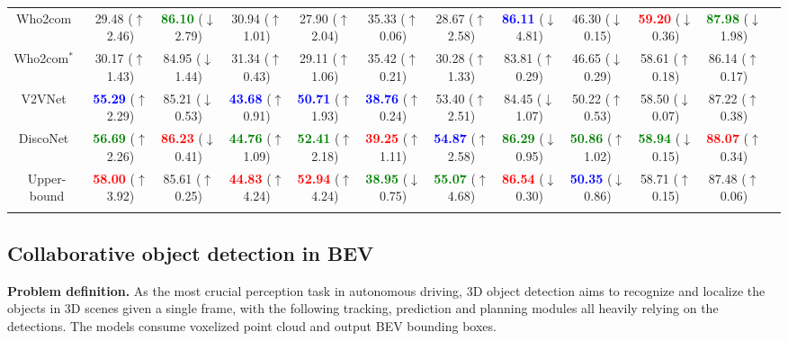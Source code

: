 \begin{table*}[t]
{\begin{tabular}{@{}cccccccccccc@{}}
Who2com~\cite{Liu2020Who2comCP} & 29.48 ($\uparrow$2.46) & \textbf{\textcolor{green}{86.10}} ($\downarrow$2.79) & 30.94 ($\uparrow$1.01) & 27.90 ($\uparrow$2.04) & 35.33 ($\uparrow$0.06) & 28.67 ($\uparrow$2.58) & \textbf{\textcolor{blue}{86.11}} ($\downarrow$4.81) & 46.30 ($\downarrow$0.15) & \textbf{\textcolor{red}{59.20}} ($\downarrow$0.36) & \textbf{\textcolor{green}{87.98}} ($\downarrow$1.98)  \\
Who2com$^*$~\cite{Liu2020Who2comCP} & 30.17 ($\uparrow$1.43) & 84.95 ($\downarrow$1.44) & 31.34 ($\uparrow$0.43) & 29.11 ($\uparrow$1.06) & 35.42 ($\uparrow$0.21) & 30.28 ($\uparrow$1.33) & 83.81 ($\uparrow$0.29) & 46.65 ($\downarrow$0.29) & 58.61 ($\uparrow$0.18) & 86.14 ($\uparrow$0.17) \\
V2VNet~\cite{Wang2020V2VNetVC} & \textbf{\textcolor{blue}{55.29}} ($\uparrow$2.29) & 85.21 ($\downarrow$0.53) & \textbf{\textcolor{blue}{43.68}} ($\uparrow$0.91) & \textbf{\textcolor{blue}{50.71}} ($\uparrow$1.93) & \textbf{\textcolor{blue}{38.76}} ($\uparrow$0.24) & 53.40 ($\uparrow$2.51) & 84.45 ($\downarrow$1.07) & 50.22 ($\uparrow$0.53) & 58.50 ($\downarrow$0.07) & 87.22 ($\uparrow$0.38) \\
DiscoNet~\cite{Li_2021_NeurIPS} & \textbf{\textcolor{green}{56.69}} ($\uparrow$2.26) & \textbf{\textcolor{red}{86.23}} ($\downarrow$0.41) & \textbf{\textcolor{green}{44.76}} ($\uparrow$1.09) & \textbf{\textcolor{green}{52.41}} ($\uparrow$2.18) & \textbf{\textcolor{red}{39.25}} ($\uparrow$1.11) & \textbf{\textcolor{blue}{54.87}} ($\uparrow$2.58) & \textbf{\textcolor{green}{86.29}} ($\downarrow$0.95) & \textbf{\textcolor{green}{50.86}} ($\uparrow$1.02) & \textbf{\textcolor{green}{58.94}} ($\downarrow$0.15) & \textbf{\textcolor{red}{88.07}} ($\uparrow$0.34)\\
Upper-bound & \textbf{\textcolor{red}{58.00}} ($\uparrow$3.92) & 85.61 ($\uparrow$0.25) & \textbf{\textcolor{red}{44.83}} ($\uparrow$4.24) & \textbf{\textcolor{red}{52.94}} ($\uparrow$4.24) & \textbf{\textcolor{green}{38.95}} ($\downarrow$0.75) & \textbf{\textcolor{green}{55.07}} ($\uparrow$4.68) & \textbf{\textcolor{red}{86.54}} ($\downarrow$0.30) & \textbf{\textcolor{blue}{50.35}} ($\downarrow$0.86) & 58.71 ($\uparrow$0.15) & 87.48 ($\uparrow$0.06) \\
\bottomrule
\vspace{-8mm}
\end{tabular}}
\end{table*}

\subsection{Collaborative object detection in BEV}
\textbf{Problem definition.} As the most crucial perception task in autonomous driving, 3D object detection aims to recognize and localize the objects in 3D scenes given a single frame, with the following tracking, prediction and planning modules all heavily relying on the detections. The models consume voxelized point cloud and output BEV bounding boxes.

